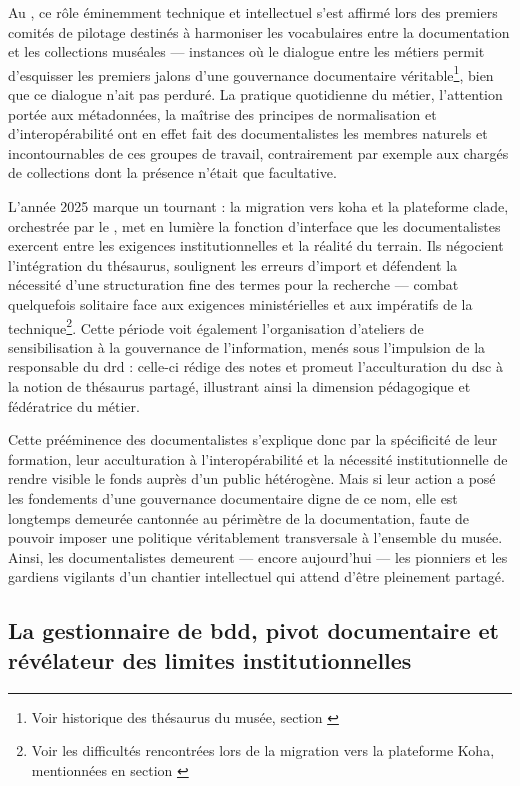 Au \mae, ce rôle éminemment technique et intellectuel s’est affirmé lors des premiers comités de pilotage destinés à harmoniser les vocabulaires entre la documentation et les collections muséales — instances où le dialogue entre les métiers permit d’esquisser les premiers jalons d’une gouvernance documentaire véritable\footnote{Voir historique des thésaurus du musée, section \textit{\hyperref[II-A-1]{}}}, bien que ce dialogue n'ait pas perduré. La pratique quotidienne du métier, l’attention portée aux métadonnées, la maîtrise des principes de normalisation et d’interopérabilité ont en effet fait des documentalistes les membres naturels et incontournables de ces groupes de travail, contrairement par exemple aux chargés de collections dont la présence n'était que facultative.

L’année 2025 marque un tournant : la migration vers \gls{koha} et la plateforme \gls{clade}, orchestrée par le \minarm, met en lumière la fonction d’interface que les documentalistes exercent entre les exigences institutionnelles et la réalité du terrain. Ils négocient l’intégration du thésaurus, soulignent les erreurs d’import et défendent la nécessité d’une structuration fine des termes pour la recherche — combat quelquefois solitaire face aux exigences ministérielles et aux impératifs de la technique\footnote{Voir les difficultés rencontrées lors de la migration vers la plateforme Koha, mentionnées en section \textit{\hyperref[I-B-2]{}}}. Cette période voit également l’organisation d’ateliers de sensibilisation à la gouvernance de l'information, menés sous l’impulsion de la responsable du \ac{drd} : celle-ci rédige des notes et promeut l’acculturation du \ac{dsc} à la notion de thésaurus partagé, illustrant ainsi la dimension pédagogique et fédératrice du métier.

Cette prééminence des documentalistes s’explique donc par la spécificité de leur formation, leur acculturation à l’interopérabilité et la nécessité institutionnelle de rendre visible le fonds auprès d’un public hétérogène. Mais si leur action a posé les fondements d’une gouvernance documentaire digne de ce nom, elle est longtemps demeurée cantonnée au périmètre de la documentation, faute de pouvoir imposer une politique véritablement transversale à l’ensemble du musée. Ainsi, les documentalistes demeurent — encore aujourd’hui — les pionniers et les gardiens vigilants d’un chantier intellectuel qui attend d’être pleinement partagé.

\subsection{La gestionnaire de \gls{bdd}, pivot documentaire et révélateur des limites institutionnelles}

